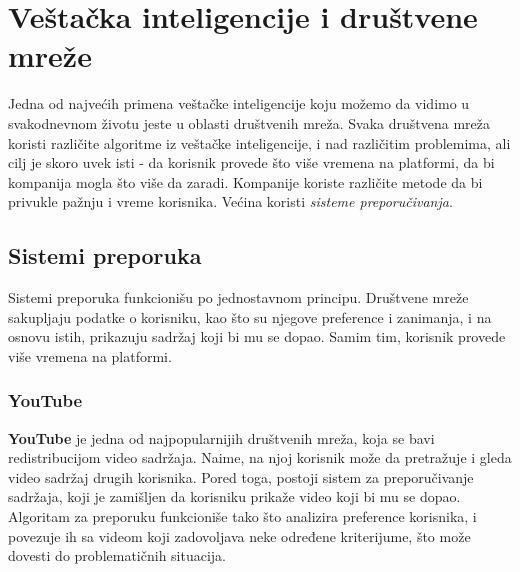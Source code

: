 \documentclass[a4paper]{article}
\newtheorem{primer}{Primer}[section]
\begin{document}

\section{Veštačka inteligencije i društvene mreže}
\label{sec:preporučivanje}

Jedna od najvećih primena veštačke inteligencije koju možemo da vidimo u svakodnevnom životu jeste u oblasti društvenih mreža. Svaka društvena mreža koristi različite algoritme iz veštačke inteligencije, i nad različitim problemima,
ali cilj je skoro uvek isti - da korisnik provede što više vremena na platformi, da bi kompanija mogla što više da zaradi.
Kompanije koriste različite metode da bi privukle pažnju i vreme korisnika. Većina koristi \emph{sisteme preporučivanja}.
\subsection{Sistemi preporuka}
Sistemi preporuka funkcionišu po jednostavnom principu. Društvene mreže sakupljaju podatke o korisniku, kao što su njegove preference i zanimanja, i na osnovu istih, prikazuju sadržaj koji bi mu se dopao. Samim tim, korisnik provede više vremena na platformi.
\subsubsection{YouTube}
\textbf{YouTube} je jedna od najpopularnijih društvenih mreža, koja se bavi redistribucijom video sadržaja. Naime, na njoj korisnik može da pretražuje i gleda video sadržaj drugih korisnika. Pored toga, postoji sistem za preporučivanje sadržaja, koji je zamišljen da korisniku prikaže video koji bi mu se dopao. Algoritam za preporuku funkcioniše tako što analizira preference korisnika, i povezuje ih sa videom koji zadovoljava neke određene kriterijume, što može dovesti do problematičnih situacija.
\end{document}
